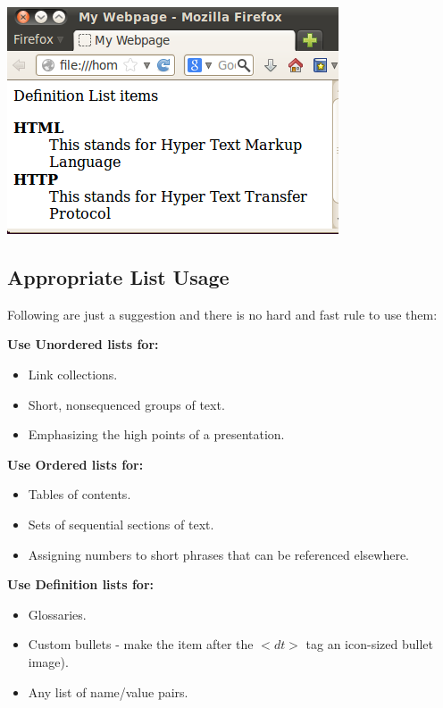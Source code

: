 \documentclass[11pt,a4paper]{article}
\begin{document}
\begin{description}
\begin{description}
\includegraphics[scale=0.7]{Definition.png}\
\end{description}
\end{description}

\subsection*{Appropriate List Usage}


Following are just a suggestion and there is no hard and fast rule to use them:\

\textbf{Use Unordered lists for:}
\begin{itemize}
\item Link collections.
\item Short, nonsequenced groups of text.
\item Emphasizing the high points of a presentation.
\end{itemize}

\textbf{Use Ordered lists for:}
\begin{itemize}
\item Tables of contents.
\item Sets of sequential sections of text.
\item Assigning numbers to short phrases that can be referenced elsewhere.
\end{itemize}


\textbf{Use Definition lists for:}
\begin{itemize}
\item Glossaries.
\item Custom bullets - make the item after the $<dt>$ tag an icon-sized bullet image).
\item Any list of name/value pairs.
\end{itemize}
\end{document}
